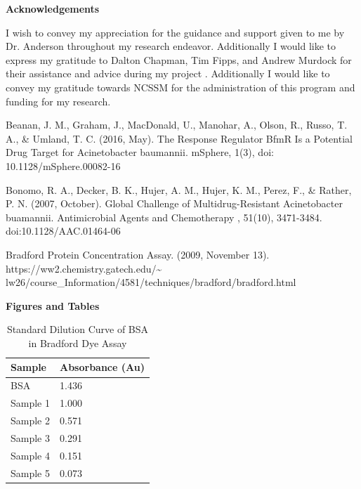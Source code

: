 \documentclass[11pt]{article}
\begin{document}
{\bf Acknowledgements}

I wish to convey my appreciation for the guidance and support given to me by Dr. Anderson throughout my research endeavor. Additionally I would like to express my gratitude to Dalton Chapman, Tim Fipps, and Andrew Murdock for their assistance and advice during my project . Additionally I would like to convey my gratitude towards NCSSM for the administration of this program and funding for my research.



\newpage

\begin{thebibliography}{5}
\begin{FlustLeft}
Beanan, J. M., Graham, J., MacDonald, U., Manohar, A., Olson, R., Russo, T. A., & Umland, T. C. (2016, May). The Response Regulator BfmR Is a Potential Drug Target for Acinetobacter baumannii. mSphere, 1(3), doi: 10.1128/mSphere.00082-16

Bonomo, R. A., Decker, B. K., Hujer, A. M., Hujer, K. M., Perez, F., & Rather, P. N. (2007, October). Global Challenge of Multidrug-Resistant Acinetobacter buamannii. Antimicrobial Agents and Chemotherapy , 51(10), 3471-3484. doi:10.1128/AAC.01464-06

Bradford Protein Concentration Assay. (2009, November 13). https://ww2.chemistry.gatech.edu/{\textasciitilde} lw26/course\_Information/4581/techniques/bradford/bradford.html
\end{FlustLeft}
\end{thebibliography}

\newpage{}
{\bf Figures and Tables}

\begin{table}[htb]
\Centering
\begin{tabular}{@{}ll@{}}
\toprule
\textbf{Sample} & \textbf{Absorbance (Au)}                 \\ \midrule
BSA             & 1.436                    \\
Sample 1        & 1.000                    \\
Sample 2        & 0.571                    \\
Sample 3        & 0.291                    \\
Sample 4        & 0.151                    \\
Sample 5        & 0.073                    \\ \bottomrule
\end{tabular}
\label{table:assay-dilution}
\caption{Standard Dilution Curve of BSA in Bradford Dye Assay}
\end{table}
\end{document}

